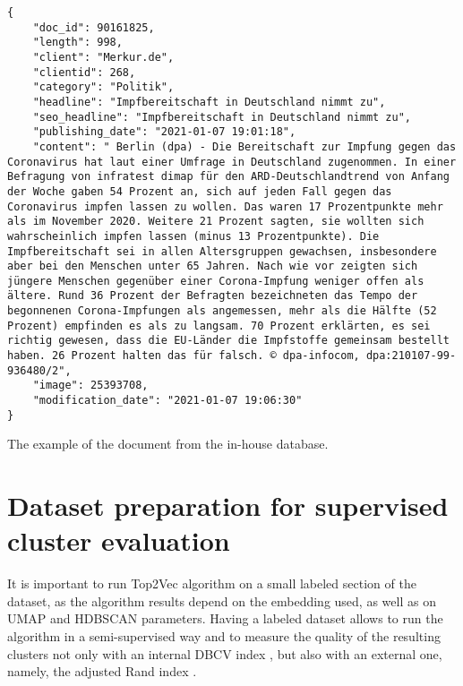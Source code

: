 \documentclass[fontsize=12pt,a4paper,twoside,openany]{scrbook}
\begin{document}
\begin{listing}[ht!]
\begin{verbatim}
{
    "doc_id": 90161825, 
    "length": 998, 
    "client": "Merkur.de", 
    "clientid": 268, 
    "category": "Politik", 
    "headline": "Impfbereitschaft in Deutschland nimmt zu", 
    "seo_headline": "Impfbereitschaft in Deutschland nimmt zu", 
    "publishing_date": "2021-01-07 19:01:18", 
    "content": " Berlin (dpa) - Die Bereitschaft zur Impfung gegen das Coronavirus hat laut einer Umfrage in Deutschland zugenommen. In einer Befragung von infratest dimap für den ARD-Deutschlandtrend von Anfang der Woche gaben 54 Prozent an, sich auf jeden Fall gegen das Coronavirus impfen lassen zu wollen. Das waren 17 Prozentpunkte mehr als im November 2020. Weitere 21 Prozent sagten, sie wollten sich wahrscheinlich impfen lassen (minus 13 Prozentpunkte). Die Impfbereitschaft sei in allen Altersgruppen gewachsen, insbesondere aber bei den Menschen unter 65 Jahren. Nach wie vor zeigten sich jüngere Menschen gegenüber einer Corona-Impfung weniger offen als ältere. Rund 36 Prozent der Befragten bezeichneten das Tempo der begonnenen Corona-Impfungen als angemessen, mehr als die Hälfte (52 Prozent) empfinden es als zu langsam. 70 Prozent erklärten, es sei richtig gewesen, dass die EU-Länder die Impfstoffe gemeinsam bestellt haben. 26 Prozent halten das für falsch. © dpa-infocom, dpa:210107-99-936480/2", 
    "image": 25393708, 
    "modification_date": "2021-01-07 19:06:30"
}

\end{verbatim}
\caption{The example of the document from the in-house database.} 
\label{listing:json-example}
\end{listing}
 
\section{Dataset preparation for supervised cluster evaluation}
\label{sec:exp_setup}

It is important to run Top2Vec algorithm on a small labeled section of the dataset, as the algorithm results depend on the embedding used, as well as on UMAP and HDBSCAN parameters. Having a labeled dataset allows to run the algorithm in a semi-supervised way and to measure the quality of the resulting clusters not only with an internal DBCV index \parencite{Moulavi14}, but also with an external one, namely, the adjusted Rand index \parencite{Hubert85}. 
\end{document}
